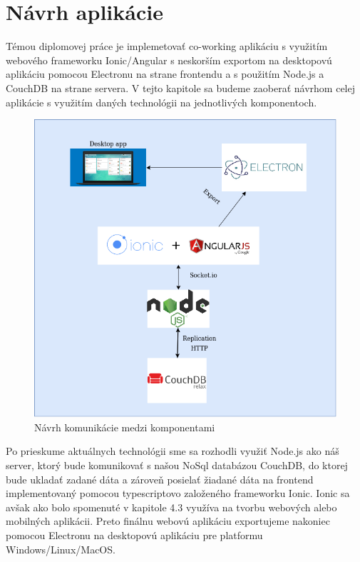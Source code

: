 \section{Návrh aplikácie}
\indent Témou diplomovej práce je implemetovať co-working aplikáciu s využitím webového frameworku Ionic/Angular s neskorším exportom na desktopovú aplikáciu pomocou Electronu na strane frontendu a s použitím Node.js a CouchDB na strane servera. V tejto kapitole sa budeme zaoberať návrhom celej aplikácie s využitím daných technológii na jednotlivých komponentoch. 

\begin{figure}[H]
    \centering
    \includegraphics[scale=0.60]{img/diagram.png}
    \caption{Návrh komunikácie medzi komponentami}
    \label{fig:diagram}
\end{figure}

\indent Po prieskume aktuálnych technológii sme sa rozhodli využiť Node.js ako náš server, ktorý bude komunikovať s našou NoSql databázou CouchDB, do ktorej bude ukladať zadané dáta a zároveň posielať žiadané dáta na frontend implementovaný pomocou typescriptovo založeného frameworku Ionic. Ionic sa avšak ako bolo spomenuté v kapitole 4.3 využíva na tvorbu webových alebo mobilných aplikácii. Preto finálnu webovú aplikáciu exportujeme nakoniec pomocou Electronu na desktopovú aplikáciu pre platformu Windows/Linux/MacOS.


